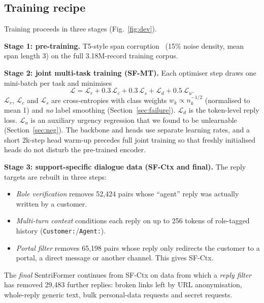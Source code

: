 \documentclass[conference]{IEEEtran}
\begin{document}
\subsection{Training recipe}
Training proceeds in three stages (Fig.~\ref{fig:dev}).

\textbf{Stage 1: pre-training.} T5-style span corruption~\cite{raffel2020exploring} (15\% noise density, mean span length 3) on the full 3.18M-record training corpus.

\textbf{Stage 2: joint multi-task training (SF-MT).} Each optimiser step draws one mini-batch per task and minimises
\begin{equation}
\mathcal{L}=\mathcal{L}_{r}+0.3\,\mathcal{L}_{c}+0.3\,\mathcal{L}_{s}+\mathcal{L}_{d}+0.5\,\mathcal{L}_{u}.
\end{equation}
$\mathcal{L}_r$, $\mathcal{L}_c$ and $\mathcal{L}_s$ are cross-entropies with class weights $w_k\propto n_k^{-1/2}$ (normalised to mean 1) and \emph{no} label smoothing (Section~\ref{sec:failure}). $\mathcal{L}_d$ is the token-level reply loss. $\mathcal{L}_u$ is an auxiliary urgency regression that we found to be unlearnable (Section~\ref{sec:neg}). The backbone and heads use separate learning rates, and a short 2k-step head warm-up precedes full joint training so that freshly initialised heads do not disturb the pre-trained encoder.

\textbf{Stage 3: support-specific dialogue data (SF-Ctx and final).} The reply targets are rebuilt in three steps:
\begin{itemize}
\item \emph{Role verification} removes 52,424 pairs whose ``agent'' reply was actually written by a customer.
\item \emph{Multi-turn context} conditions each reply on up to 256 tokens of role-tagged history (\texttt{Customer:}/\texttt{Agent:}).
\item \emph{Portal filter} removes 65,198 pairs whose reply only redirects the customer to a portal, a direct message or another channel. This gives SF-Ctx.
\end{itemize}
The \emph{final} SentriFormer continues from SF-Ctx on data from which a \emph{reply filter} has removed 29,483 further replies: broken links left by URL anonymisation, whole-reply generic text, bulk personal-data requests and secret requests.
\end{document}
